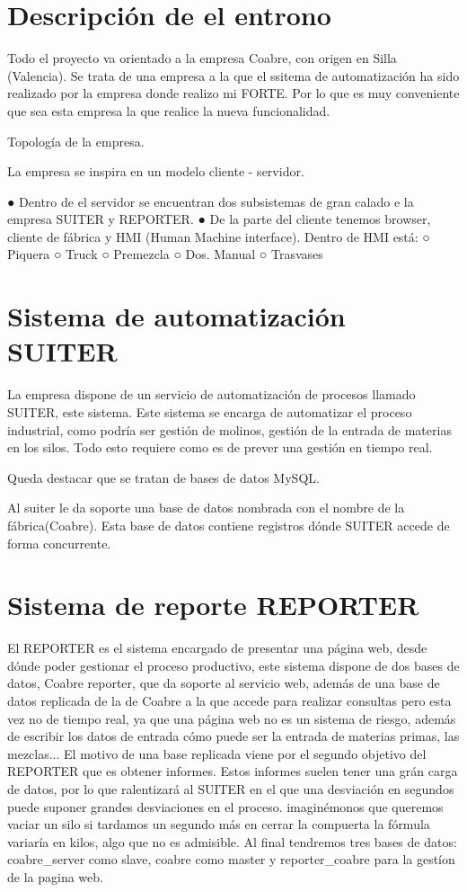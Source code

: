 \section*{Descripción de el entrono}

Todo el proyecto va orientado a la empresa Coabre, con origen en Silla (Valencia).
 Se trata de una empresa a la que el ssitema de automatización ha sido realizado por la empresa donde realizo mi FORTE.
 Por lo que es muy conveniente que sea esta empresa la que realice la nueva funcionalidad. 

Topología de la empresa.

La empresa se inspira en un modelo cliente - servidor.

●	Dentro de el servidor se encuentran dos subsistemas de gran calado e la empresa SUITER y REPORTER.
●	De la parte del cliente tenemos browser, cliente de fábrica y HMI (Human Machine  interface). Dentro de HMI está:
	○	Piquera
	○	Truck
	○	Premezcla
	○	Dos. Manual
	○	Trasvases 

\section*{Sistema de automatización SUITER}

La empresa dispone de un servicio de automatización de procesos llamado SUITER, este 
sistema. Este sistema se encarga de automatizar el proceso industrial, como podría ser
 gestión de molinos, gestión de la entrada de materias en los silos. Todo esto requiere 
como es de prever una gestión en tiempo real.

Queda destacar que se tratan de bases de datos MySQL.

Al suiter le da soporte una base de datos nombrada con el nombre de la fábrica(Coabre).
 Esta base de datos contiene registros dónde SUITER accede de forma concurrente.


\section*{Sistema de reporte REPORTER}

El REPORTER es el sistema encargado de presentar una página web, desde dónde
 poder gestionar el proceso productivo, este sistema dispone de dos bases de datos,
 Coabre reporter, que da soporte al servicio web, además de una base de datos replicada
 de la de Coabre a la que accede para realizar consultas pero esta vez no de tiempo real, 
ya que una página web no es un sistema de riesgo, además de escribir los datos de
 entrada cómo puede ser la entrada de materias primas, las mezclas... El motivo de
 una base replicada viene por el segundo objetivo del REPORTER que es obtener informes. 
Estos informes suelen tener una grán carga de datos, por lo que ralentizará al SUITER
 en el que una desviación en segundos puede suponer grandes desviaciones en el proceso.
 imaginémonos que queremos vaciar un silo si tardamos un segundo más en cerrar la compuerta
 la fórmula variaría en kilos, algo que no es admisible. Al final tendremos tres bases de datos:
 coabre_server como slave, coabre como master y reporter_coabre para la gestíon de la pagina web.

